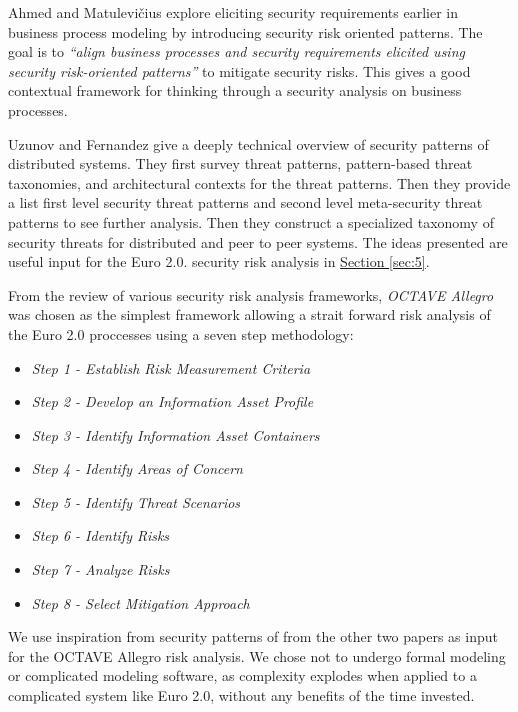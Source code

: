 \documentclass[a4paper,12pt]{article} %
\newcommand{\hypersectionref}[1]{\hyperref[#1]{Section \ref{#1}}}
\begin{document}
Ahmed and Matulevi\v{c}ius explore eliciting security requirements earlier in business process modeling by introducing security risk oriented patterns\cite{Ahmed:2014:SBP:2588915.2589308}. The goal is to \textit{``align business processes and security requirements elicited using security risk-oriented patterns''} to mitigate security risks. This gives a good contextual framework for thinking through a security analysis on business processes.

Uzunov and Fernandez give a deeply technical overview of security patterns of distributed systems\cite{Uzunov:2014:EPL:2588915.2589309}. They first survey threat patterns, pattern-based threat taxonomies, and architectural contexts for the threat patterns. Then they provide a list first level security threat patterns and second level meta-security threat patterns to see further analysis. Then they construct a specialized taxonomy of security threats for distributed and peer to peer systems. The ideas presented are useful input for the Euro 2.0. security risk analysis in \hypersectionref{sec:5}.

From the review of various security risk analysis frameworks, \textit{OCTAVE Allegro} was chosen as the simplest framework allowing a strait forward risk analysis of the Euro 2.0 proccesses using a seven step methodology\cite{CaralliIntroducingOCTAVE2007}:

\begin{itemize}
	\item \textit{Step 1 - Establish Risk Measurement Criteria}
	\item \textit{Step 2 - Develop an Information Asset Profile}
	\item \textit{Step 3 - Identify Information Asset Containers}
	\item \textit{Step 4 - Identify Areas of Concern}
	\item \textit{Step 5 - Identify Threat Scenarios}
	\item \textit{Step 6 - Identify Risks}
	\item \textit{Step 7 - Analyze Risks}
	\item \textit{Step 8 - Select Mitigation Approach}
\end{itemize}

We use inspiration from security patterns of from the other two papers as input for the OCTAVE Allegro risk analysis. We chose not to undergo formal modeling or complicated modeling software, as complexity explodes when applied to a complicated system like Euro 2.0, without any benefits of the time invested.
\end{document}
